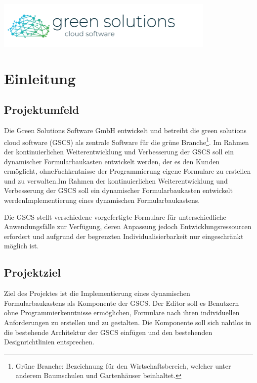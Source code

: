 \documentclass[a4paper,11pt]{article}
\begin{document}
\begin{titlepage}
\begin{center}
\includegraphics[width=0.8\textwidth]{green_solutions_logo}
\end{center}
\end{titlepage}

\tableofcontents
\newpage


\section{Einleitung}
\subsection{Projektumfeld}
Die Green Solutions Software GmbH entwickelt und betreibt die green solutions cloud software (GSCS) als zentrale Software für die grüne Branche\footnote{Grüne Branche: Bezeichnung für den Wirtschaftsbereich, welcher unter anderem Baumschulen und Gartenhäuser beinhaltet.}. Im Rahmen der kontinuierlichen Weiterentwicklung und Verbesserung der GSCS soll ein dynamischer Formularbaukasten entwickelt werden, der es den Kunden ermöglicht, ohneFachkentnisse der Programmierung eigene Formulare zu erstellen und zu verwalten.Im Rahmen der kontinuierlichen Weiterentwicklung und Verbesserung der GSCS soll ein dynamischer Formularbaukasten entwickelt werdenImplementierung eines dynamischen Formularbaukastens.

\noindent Die GSCS stellt verschiedene vorgefertigte Formulare für unterschiedliche Anwendungsfälle zur Verfügung, deren Anpassung jedoch Entwicklungsressourcen erfordert und aufgrund der begrenzten Individualisierbarkeit nur eingeschränkt möglich ist.

\subsection{Projektziel}
Ziel des Projektes ist die Implementierung eines dynamischen Formularbaukastens als Komponente der GSCS. Der Editor soll es Benutzern ohne Programmierkenntnisse ermöglichen, Formulare nach ihren individuellen Anforderungen zu erstellen und zu gestalten. Die Komponente soll sich nahtlos in die bestehende Architektur der GSCS einfügen und den bestehenden Designrichtlinien entsprechen.
\end{document}
